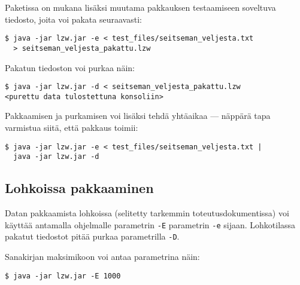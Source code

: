 \documentclass{article}
\begin{document}
Paketissa on mukana lisäksi muutama pakkauksen testaamiseen soveltuva tiedosto, joita voi pakata seuraavasti:
\begin{verbatim}
$ java -jar lzw.jar -e < test_files/seitseman_veljesta.txt
  > seitseman_veljesta_pakattu.lzw
\end{verbatim}

Pakatun tiedoston voi purkaa näin:
\begin{verbatim}
$ java -jar lzw.jar -d < seitseman_veljesta_pakattu.lzw
<purettu data tulostettuna konsoliin>
\end{verbatim}

Pakkaamisen ja purkamisen voi lisäksi tehdä yhtäaikaa --- näppärä tapa varmistua siitä, että pakkaus toimii:
\begin{verbatim}
$ java -jar lzw.jar -e < test_files/seitseman_veljesta.txt |
  java -jar lzw.jar -d
\end{verbatim}

\subsection{Lohkoissa pakkaaminen}
Datan pakkaamista lohkoissa (selitetty tarkemmin toteutusdokumentissa) voi käyttää antamalla ohjelmalle parametrin \verb+-E+ parametrin \verb+-e+ sijaan. Lohkotilassa pakatut tiedostot pitää purkaa parametrilla \verb+-D+.

Sanakirjan maksimikoon voi antaa parametrina näin:
\begin{verbatim}
$ java -jar lzw.jar -E 1000
\end{verbatim}
\end{document}
